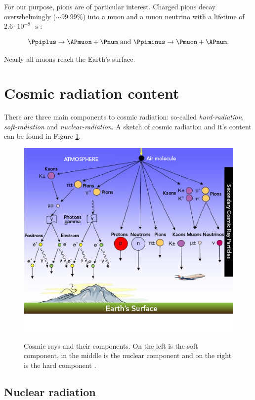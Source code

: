 For our purpose, pions are of particular interest. Charged pions decay overwhelmingly ($\sim 99.99\%$) into a muon and a muon neutrino with a lifetime of $2.6 \cdot 10^{-8} \text{ } \si{\second}$ \cite{Tanabashi:2018oca}:

\begin{equation*}
\Ppiplus \rightarrow \APmuon + \Pnum \text{ and } \Ppiminus \rightarrow \Pmuon + \APnum.
\end{equation*}

Nearly all muons reach the Earth's surface.

\section{Cosmic radiation content}

There are three main components to cosmic radiation: so-called \textit{hard-radiation}, \textit{soft-radiation} and \textit{nuclear-radiation}. A sketch of cosmic radiation and it's content can be found in Figure \ref{fig:cos}.

\begin{figure}[htbp]
\centering
\includegraphics[width=\linewidth]{./fig/Cosmic_ray_scattering.png}
\label{fig:cos}
\caption{Cosmic rays and their components. On the left is the soft component, in the middle is the nuclear component and on the right is the hard component \cite{LTSCA}.}
\end{figure}

\subsection{Nuclear radiation}

